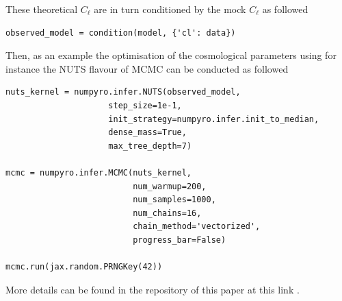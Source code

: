 \documentclass[final,5p,times,twocolumn,authoryear]{elsarticle}
\newcommand{\nblink}[1]{\href{https://github.com/DifferentiableUniverseInitiative/jax-cosmo-paper/blob/master/notebooks/#1.ipynb}{\faFileCodeO}}
\begin{document}
These theoretical $C_{\ell}$ are in turn conditioned by the mock $C_\ell$ as followed
\begin{verbatim}
observed_model = condition(model, {'cl': data})
\end{verbatim}
Then, as an example the optimisation of the cosmological parameters using for instance the NUTS flavour of MCMC can be conducted as followed
\begin{verbatim}
nuts_kernel = numpyro.infer.NUTS(observed_model,
                     step_size=1e-1, 
                     init_strategy=numpyro.infer.init_to_median,
                     dense_mass=True,
                     max_tree_depth=7)

mcmc = numpyro.infer.MCMC(nuts_kernel, 
                          num_warmup=200, 
                          num_samples=1000,
                          num_chains=16,
                          chain_method='vectorized',
                          progress_bar=False)

mcmc.run(jax.random.PRNGKey(42))
\end{verbatim}
More details can be found in the repository of this paper at this link \nblink{VectorizedNumPyro_block}.
 
\typeout{}


\end{document}
